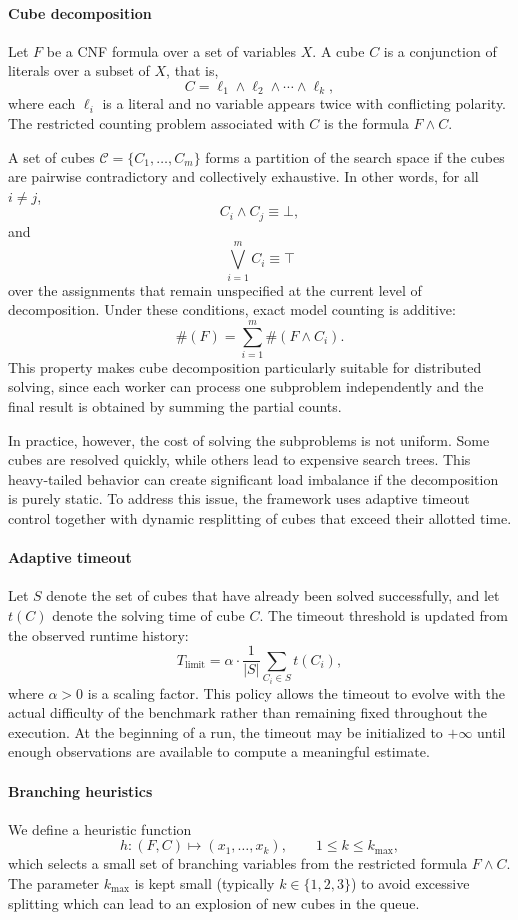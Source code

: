 \documentclass{report}
\begin{document}
\paragraph{Cube decomposition}
Let $F$ be a CNF formula over a set of variables $X$. A cube $C$ is a conjunction of literals over a subset of $X$, that is,
\[
C = \ell_1 \land \ell_2 \land \cdots \land \ell_k,
\]
where each $\ell_i$ is a literal and no variable appears twice with conflicting polarity. 
The restricted counting problem associated with $C$ is the formula $F \land C$.

A set of cubes $\mathcal{C} = \{C_1,\dots,C_m\}$ forms a partition of the search space 
if the cubes are pairwise contradictory and collectively exhaustive. In other words, for all $i \neq j$,
\[
C_i \land C_j \equiv \bot,
\]
and
\[
\bigvee_{i=1}^{m} C_i \equiv \top
\]
over the assignments that remain unspecified at the current level of decomposition. 
Under these conditions, exact model counting is additive:
\[
\#(F) = \sum_{i=1}^{m} \#(F \land C_i).
\]
This property makes cube decomposition particularly suitable for distributed solving, 
since each worker can process one subproblem independently and the final result is obtained by summing the partial counts.

In practice, however, the cost of solving the subproblems is not uniform.
Some cubes are resolved quickly, while others lead to expensive search trees. 
This heavy-tailed behavior can create significant load imbalance if the decomposition is purely static. 
To address this issue, the framework uses adaptive timeout control together with dynamic resplitting of 
cubes that exceed their allotted time.

\paragraph{Adaptive timeout}
Let $S$ denote the set of cubes that have already been solved successfully, and let $t(C)$ denote the solving time of cube $C$. The timeout threshold is updated from the observed runtime history:
\[
T_{\text{limit}} = \alpha \cdot \frac{1}{|S|}\sum_{C_i \in S} t(C_i),
\]
where $\alpha > 0$ is a scaling factor. This policy allows the timeout to evolve with the actual difficulty of the benchmark rather than remaining fixed throughout the execution. At the beginning of a run, the timeout may be initialized to $+\infty$ until enough observations are available to compute a meaningful estimate.

\paragraph{Branching heuristics}
We define a heuristic function
\[
h : (F,C) \mapsto (x_1,\dots,x_k), \qquad 1 \le k \le k_{\max},
\]
which selects a small set of branching variables from the restricted formula $F \land C$. 
The parameter $k_{\max}$ is kept small (typically $k \in \{1,2,3\}$) to avoid excessive splitting 
which can lead to an explosion of new cubes in the queue.
\end{document}

